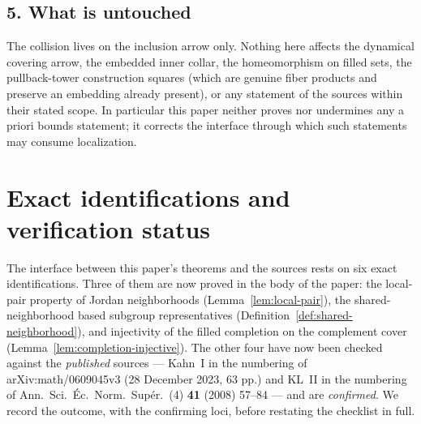 \documentclass[11pt,reqno]{amsart}
\theoremstyle{definition}
\theoremstyle{remark}
\begin{document}
\subsection*{5. What is untouched}
The collision lives on the inclusion arrow only.  Nothing here affects
the dynamical covering arrow, the embedded inner collar, the
homeomorphism on filled sets, the pullback-tower construction squares
(which are genuine fiber products and preserve an embedding already
present), or any statement of the sources within their stated scope.
In particular this paper neither proves nor undermines any a priori
bounds statement; it corrects the interface through which such
statements may consume localization.

\section{Exact identifications and verification status}
\label{sec:verification}

The interface between this paper's theorems and the sources rests on
six exact identifications.  Three of them are now proved in the body of
the paper: the local-pair property of Jordan neighborhoods
(Lemma~\ref{lem:local-pair}), the shared-neighborhood based subgroup
representatives (Definition~\ref{def:shared-neighborhood}), and
injectivity of the filled completion on the complement cover
(Lemma~\ref{lem:completion-injective}).  The other four have now been
checked against the \emph{published} sources --- Kahn~I in the
numbering of arXiv:math/0609045v3 (28 December 2023, 63 pp.) and KL~II
in the numbering of Ann.\ Sci.\ \'Ec.\ Norm.\ Sup\'er.\ (4)
\textbf{41} (2008) 57--84 --- and are \emph{confirmed}.  We record the
outcome, with the confirming loci, before restating the checklist in
full.
\end{document}

